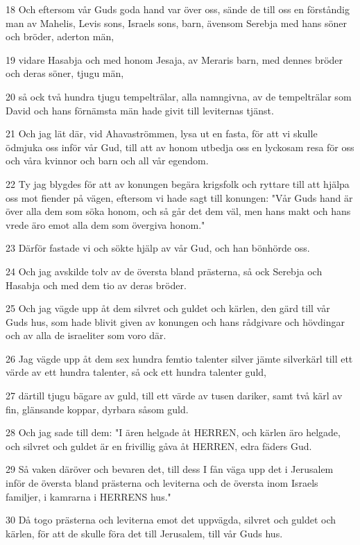 \par 18 Och eftersom vår Guds goda hand var över oss, sände de till oss en förståndig man av Mahelis, Levis sons, Israels sons, barn, ävensom Serebja med hans söner och bröder, aderton män,
\par 19 vidare Hasabja och med honom Jesaja, av Meraris barn, med dennes bröder och deras söner, tjugu män,
\par 20 så ock två hundra tjugu tempelträlar, alla namngivna, av de tempelträlar som David och hans förnämsta män hade givit till leviternas tjänst.
\par 21 Och jag lät där, vid Ahavaströmmen, lysa ut en fasta, för att vi skulle ödmjuka oss inför vår Gud, till att av honom utbedja oss en lyckosam resa för oss och våra kvinnor och barn och all vår egendom.
\par 22 Ty jag blygdes för att av konungen begära krigsfolk och ryttare till att hjälpa oss mot fiender på vägen, eftersom vi hade sagt till konungen: "Vår Guds hand är över alla dem som söka honom, och så går det dem väl, men hans makt och hans vrede äro emot alla dem som övergiva honom."
\par 23 Därför fastade vi och sökte hjälp av vår Gud, och han bönhörde oss.
\par 24 Och jag avskilde tolv av de översta bland prästerna, så ock Serebja och Hasabja och med dem tio av deras bröder.
\par 25 Och jag vägde upp åt dem silvret och guldet och kärlen, den gärd till vår Guds hus, som hade blivit given av konungen och hans rådgivare och hövdingar och av alla de israeliter som voro där.
\par 26 Jag vägde upp åt dem sex hundra femtio talenter silver jämte silverkärl till ett värde av ett hundra talenter, så ock ett hundra talenter guld,
\par 27 därtill tjugu bägare av guld, till ett värde av tusen dariker, samt två kärl av fin, glänsande koppar, dyrbara såsom guld.
\par 28 Och jag sade till dem: "I ären helgade åt HERREN, och kärlen äro helgade, och silvret och guldet är en frivillig gåva åt HERREN, edra fäders Gud.
\par 29 Så vaken däröver och bevaren det, till dess I fån väga upp det i Jerusalem inför de översta bland prästerna och leviterna och de översta inom Israels familjer, i kamrarna i HERRENS hus."
\par 30 Då togo prästerna och leviterna emot det uppvägda, silvret och guldet och kärlen, för att de skulle föra det till Jerusalem, till vår Guds hus.
